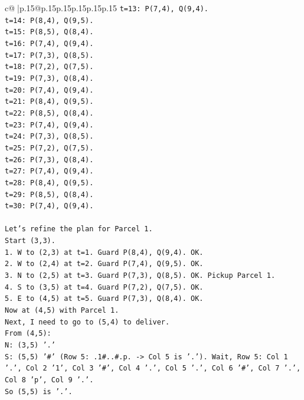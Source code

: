 \documentclass{article}
\begin{document}
{\begin{supertabular}{c@{$\;$}|p{.15\linewidth}@{}p{.15\linewidth}p{.15\linewidth}p{.15\linewidth}p{.15\linewidth}p{.15\linewidth}}
{{{\texttt{t=13: P(7,4), Q(9,4).} \\
\texttt{t=14: P(8,4), Q(9,5).} \\
\texttt{t=15: P(8,5), Q(8,4).} \\
\texttt{t=16: P(7,4), Q(9,4).} \\
\texttt{t=17: P(7,3), Q(8,5).} \\
\texttt{t=18: P(7,2), Q(7,5).} \\
\texttt{t=19: P(7,3), Q(8,4).} \\
\texttt{t=20: P(7,4), Q(9,4).} \\
\texttt{t=21: P(8,4), Q(9,5).} \\
\texttt{t=22: P(8,5), Q(8,4).} \\
\texttt{t=23: P(7,4), Q(9,4).} \\
\texttt{t=24: P(7,3), Q(8,5).} \\
\texttt{t=25: P(7,2), Q(7,5).} \\
\texttt{t=26: P(7,3), Q(8,4).} \\
\texttt{t=27: P(7,4), Q(9,4).} \\
\texttt{t=28: P(8,4), Q(9,5).} \\
\texttt{t=29: P(8,5), Q(8,4).} \\
\texttt{t=30: P(7,4), Q(9,4).} \\
\\ 
\texttt{Let's refine the plan for Parcel 1.} \\
\texttt{Start (3,3).} \\
\texttt{1. W to (2,3) at t=1. Guard P(8,4), Q(9,4). OK.} \\
\texttt{2. W to (2,4) at t=2. Guard P(7,4), Q(9,5). OK.} \\
\texttt{3. N to (2,5) at t=3. Guard P(7,3), Q(8,5). OK. Pickup Parcel 1.} \\
\texttt{4. S to (3,5) at t=4. Guard P(7,2), Q(7,5). OK.} \\
\texttt{5. E to (4,5) at t=5. Guard P(7,3), Q(8,4). OK.} \\
\texttt{Now at (4,5) with Parcel 1.} \\
\texttt{Next, I need to go to (5,4) to deliver.} \\
\texttt{From (4,5):} \\
\texttt{N: (3,5) '.'} \\
\texttt{S: (5,5) '\#' (Row 5: .1\#..\#.p. {-}> Col 5 is '.'). Wait, Row 5: Col 1 '.', Col 2 '1', Col 3 '\#', Col 4 '.', Col 5 '.', Col 6 '\#', Col 7 '.', Col 8 'p', Col 9 '.'.} \\
\texttt{So (5,5) is '.'.} \\
}}}
\end{supertabular}}
\end{document}
